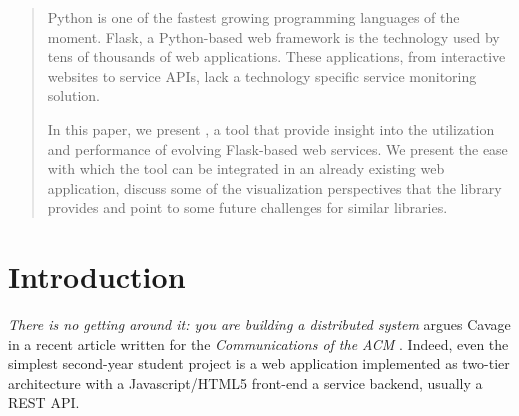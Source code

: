
\begin{abstract}

  Python is one of the fastest growing programming languages of the moment. Flask, a Python-based web framework is the technology used by tens of thousands of web applications. These applications, from interactive websites to service APIs, lack a technology specific service monitoring solution. 

  In this paper, we present \tool, a tool that provide insight into the utilization and performance of evolving Flask-based web services. We present the ease with which the tool can be integrated in an already existing web application, discuss some of the visualization perspectives that the library provides and point to some future challenges for similar libraries.

\end{abstract}




\section{Introduction}




{\em There is no getting around it: you are building a distributed system} argues Cavage  in a recent article written for the {\em Communications of the ACM} \cite{cavage2013there}. Indeed, even the simplest second-year student project is a web application implemented as two-tier architecture with a Javascript/HTML5 front-end a service backend, usually a REST API.

